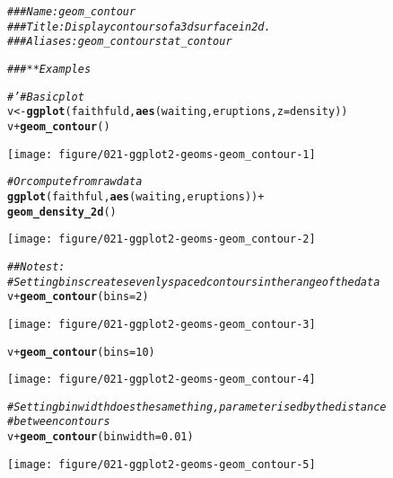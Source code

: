 \documentclass[a4paper,titlepage]{tufte-handout}\usepackage[]{graphicx}\usepackage[]{color}
\makeatletter
\def\maxwidth{ %
  \ifdim\Gin@nat@width>\linewidth
    \linewidth
  \else
    \Gin@nat@width
  \fi
}
\newcommand{\hlnum}[1]{\textcolor[rgb]{0.686,0.059,0.569}{#1}}%
\newcommand{\hlcom}[1]{\textcolor[rgb]{0.678,0.584,0.686}{\textit{#1}}}%
\newcommand{\hlopt}[1]{\textcolor[rgb]{0,0,0}{#1}}%
\newcommand{\hlstd}[1]{\textcolor[rgb]{0.345,0.345,0.345}{#1}}%
\newcommand{\hlkwb}[1]{\textcolor[rgb]{0.69,0.353,0.396}{#1}}%
\newcommand{\hlkwc}[1]{\textcolor[rgb]{0.333,0.667,0.333}{#1}}%
\newcommand{\hlkwd}[1]{\textcolor[rgb]{0.737,0.353,0.396}{\textbf{#1}}}%
\newenvironment{kframe}{%
 \def\at@end@of@kframe{}%
 \ifinner\ifhmode%
  \def\at@end@of@kframe{\end{minipage}}%
  \begin{minipage}{\columnwidth}%
 \fi\fi%
 \def\FrameCommand##1{\hskip\@totalleftmargin \hskip-\fboxsep
 \colorbox{shadecolor}{##1}\hskip-\fboxsep
     \hskip-\linewidth \hskip-\@totalleftmargin \hskip\columnwidth}%
 \MakeFramed {\advance\hsize-\width
   \@totalleftmargin\z@ \linewidth\hsize
   \@setminipage}}%
 {\par\unskip\endMakeFramed%
 \at@end@of@kframe}
\newenvironment{knitrout}{}{} %
\makeatother
\begin{document}
\begin{knitrout}
\color{fgcolor}\begin{kframe}
\begin{alltt}
\hlcom{### Name: geom_contour}
\hlcom{### Title: Display contours of a 3d surface in 2d.}
\hlcom{### Aliases: geom_contour stat_contour}

\hlcom{### ** Examples}

\hlcom{#' # Basic plot}
\hlstd{v} \hlkwb{<-} \hlkwd{ggplot}\hlstd{(faithfuld,} \hlkwd{aes}\hlstd{(waiting, eruptions,} \hlkwc{z} \hlstd{= density))}
\hlstd{v} \hlopt{+} \hlkwd{geom_contour}\hlstd{()}
\end{alltt}
\end{kframe}
\texttt{[image: figure/021-ggplot2-geoms-geom\_contour-1]} 
\begin{kframe}\begin{alltt}
\hlcom{# Or compute from raw data}
\hlkwd{ggplot}\hlstd{(faithful,} \hlkwd{aes}\hlstd{(waiting, eruptions))} \hlopt{+}
  \hlkwd{geom_density_2d}\hlstd{()}
\end{alltt}
\end{kframe}
\texttt{[image: figure/021-ggplot2-geoms-geom\_contour-2]} 
\begin{kframe}\begin{alltt}
\hlcom{## No test: }
\hlcom{# Setting bins creates evenly spaced contours in the range of the data}
\hlstd{v} \hlopt{+} \hlkwd{geom_contour}\hlstd{(}\hlkwc{bins} \hlstd{=} \hlnum{2}\hlstd{)}
\end{alltt}
\end{kframe}
\texttt{[image: figure/021-ggplot2-geoms-geom\_contour-3]} 
\begin{kframe}\begin{alltt}
\hlstd{v} \hlopt{+} \hlkwd{geom_contour}\hlstd{(}\hlkwc{bins} \hlstd{=} \hlnum{10}\hlstd{)}
\end{alltt}
\end{kframe}
\texttt{[image: figure/021-ggplot2-geoms-geom\_contour-4]} 
\begin{kframe}\begin{alltt}
\hlcom{# Setting binwidth does the same thing, parameterised by the distance}
\hlcom{# between contours}
\hlstd{v} \hlopt{+} \hlkwd{geom_contour}\hlstd{(}\hlkwc{binwidth} \hlstd{=} \hlnum{0.01}\hlstd{)}
\end{alltt}
\end{kframe}
\texttt{[image: figure/021-ggplot2-geoms-geom\_contour-5]} 

\end{knitrout}
\end{document}
